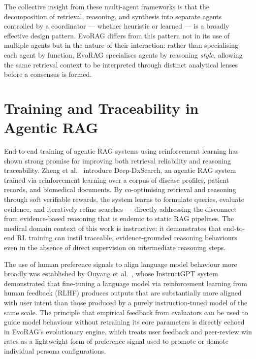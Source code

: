 The collective insight from these multi-agent frameworks is that the decomposition
of retrieval, reasoning, and synthesis into separate agents controlled by a
coordinator — whether heuristic or learned — is a broadly effective design pattern.
EvoRAG differs from this pattern not in its use of multiple agents but in the
nature of their interaction: rather than specialising each agent by function, EvoRAG
specialises agents by reasoning \emph{style}, allowing the same retrieval context
to be interpreted through distinct analytical lenses before a consensus is formed.

\section{Training and Traceability in Agentic RAG}
 
End-to-end training of agentic RAG systems using reinforcement learning has shown
strong promise for improving both retrieval reliability and reasoning traceability.
Zheng et al.~\cite{zheng2025deepdx} introduce Deep-DxSearch, an agentic RAG system
trained via reinforcement learning over a corpus of disease profiles, patient records,
and biomedical documents.
By co-optimising retrieval and reasoning through soft verifiable rewards, the system
learns to formulate queries, evaluate evidence, and iteratively refine searches —
directly addressing the disconnect from evidence-based reasoning that is endemic to
static RAG pipelines.
The medical domain context of this work is instructive: it demonstrates that
end-to-end RL training can instil traceable, evidence-grounded reasoning behaviours
even in the absence of direct supervision on intermediate reasoning steps.

The use of human preference signals to align language model behaviour more broadly
was established by Ouyang et al.~\cite{ouyang2022rlhf}, whose InstructGPT system
demonstrated that fine-tuning a language model via reinforcement learning from human
feedback (RLHF) produces outputs that are substantially more aligned with user intent
than those produced by a purely instruction-tuned model of the same scale.
The principle that empirical feedback from evaluators can be used to guide model
behaviour without retraining its core parameters is directly echoed in EvoRAG's
evolutionary engine, which treats user feedback and peer-review win rates as a
lightweight form of preference signal used to promote or demote individual persona
configurations.

